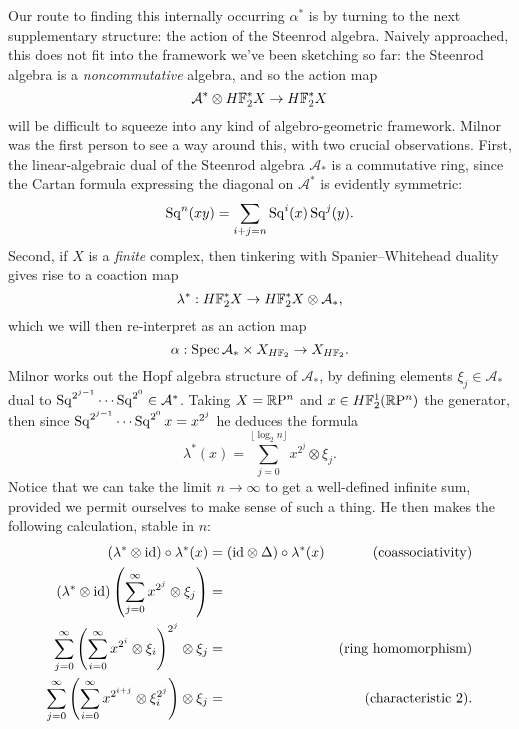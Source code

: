 Our route to finding this internally occurring $\alpha^*$ is by turning to the next supplementary structure: the action of the Steenrod algebra.  Naively approached, this does not fit into the framework we've been sketching so far: the Steenrod algebra is a \emph{noncommutative} algebra, and so the action map \[\mathcal A^* \otimes H\mathbb F_2^* X \to H\mathbb F_2^* X\] will be difficult to squeeze into any kind of algebro-geometric framework.  Milnor was the first person to see a way around this, with two crucial observations.  First, the linear-algebraic dual of the Steenrod algebra $\mathcal A_*$ is a commutative ring, since the Cartan formula expressing the diagonal on $\mathcal A^*$ is evidently symmetric: \[\operatorname{Sq}^n(x y) = \sum_{i+j=n} \operatorname{Sq}^i(x) \operatorname{Sq}^j(y).\]    Second, if $X$ is a \emph{finite} complex, then tinkering with Spanier--Whitehead duality gives rise to a coaction map \[\lambda^*: H\mathbb F_2^* X \to H\mathbb F_2^* X \otimes \mathcal A_*,\] which we will then re-interpret as an action map \[\alpha: \operatorname{Spec} \mathcal A_* \times X_{H\mathbb F_2} \to X_{H\mathbb F_2}.\]  Milnor works out the Hopf algebra structure of $\mathcal A_*$, by defining elements $\xi_j \in \mathcal A_*$ dual to $\operatorname{Sq}^{2^{j-1}} \cdots \operatorname{Sq}^{2^0} \in \mathcal A^*$.  Taking $X = \mathbb R\mathrm P^n$ and $x \in H\mathbb F_2^1(\mathbb R\mathrm P^n)$ the generator, then since $\operatorname{Sq}^{2^{j-1}} \cdots \operatorname{Sq}^{2^0} x = x^{2^j}$ he deduces the formula \[\lambda^*(x) = \sum_{j=0}^{\lfloor \log_2 n \rfloor} x^{2^j} \otimes \xi_j.\]  Notice that we can take the limit $n \to \infty$ to get a well-defined infinite sum, provided we permit ourselves to make sense of such a thing.  He then makes the following calculation, stable in $n$:
\begin{align*}
(\lambda^* \otimes \mathrm{id}) \circ \lambda^*(x) & = (\mathrm{id} \otimes \Delta) \circ \lambda^*(x) & \text{(coassociativity)} \\
(\lambda^* \otimes \mathrm{id}) \left( \sum_{j=0}^\infty x^{2^j} \otimes \xi_j \right) & = \\
\sum_{j=0}^\infty \left( \sum_{i=0}^\infty x^{2^i} \otimes \xi_i \right)^{2^j} \otimes \xi_j & = & \text{(ring homomorphism)} \\
\sum_{j=0}^\infty \left( \sum_{i=0}^\infty x^{2^{i+j}} \otimes \xi_i^{2^j} \right) \otimes \xi_j & = & \text{(characteristic $2$)}.
\end{align*}
